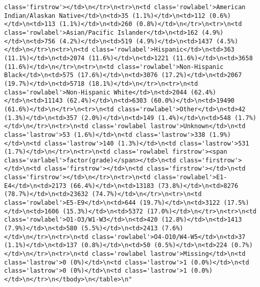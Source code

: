 \documentclass[
]{article}
\begin{document}
\begin{verbatim}
class='firstrow'></td>\n</tr>\n<tr>\n<td class='rowlabel'>American Indian/Alaskan Native</td>\n<td>35 (1.1%)</td>\n<td>112 (0.6%)</td>\n<td>113 (1.1%)</td>\n<td>260 (0.8%)</td>\n</tr>\n<tr>\n<td class='rowlabel'>Asian/Pacific Islander</td>\n<td>162 (4.9%)</td>\n<td>756 (4.2%)</td>\n<td>519 (4.9%)</td>\n<td>1437 (4.5%)</td>\n</tr>\n<tr>\n<td class='rowlabel'>Hispanic</td>\n<td>363 (11.1%)</td>\n<td>2074 (11.6%)</td>\n<td>1221 (11.6%)</td>\n<td>3658 (11.6%)</td>\n</tr>\n<tr>\n<td class='rowlabel'>Non-Hispanic Black</td>\n<td>575 (17.6%)</td>\n<td>3076 (17.2%)</td>\n<td>2067 (19.7%)</td>\n<td>5718 (18.1%)</td>\n</tr>\n<tr>\n<td class='rowlabel'>Non-Hispanic White</td>\n<td>2044 (62.4%)</td>\n<td>11143 (62.4%)</td>\n<td>6303 (60.0%)</td>\n<td>19490 (61.6%)</td>\n</tr>\n<tr>\n<td class='rowlabel'>Other</td>\n<td>42 (1.3%)</td>\n<td>357 (2.0%)</td>\n<td>149 (1.4%)</td>\n<td>548 (1.7%)</td>\n</tr>\n<tr>\n<td class='rowlabel lastrow'>Unknown</td>\n<td class='lastrow'>53 (1.6%)</td>\n<td class='lastrow'>338 (1.9%)</td>\n<td class='lastrow'>140 (1.3%)</td>\n<td class='lastrow'>531 (1.7%)</td>\n</tr>\n<tr>\n<td class='rowlabel firstrow'><span class='varlabel'>factor(grade)</span></td>\n<td class='firstrow'></td>\n<td class='firstrow'></td>\n<td class='firstrow'></td>\n<td class='firstrow'></td>\n</tr>\n<tr>\n<td class='rowlabel'>E1-E4</td>\n<td>2173 (66.4%)</td>\n<td>13183 (73.8%)</td>\n<td>8276 (78.7%)</td>\n<td>23632 (74.7%)</td>\n</tr>\n<tr>\n<td class='rowlabel'>E5-E9</td>\n<td>644 (19.7%)</td>\n<td>3122 (17.5%)</td>\n<td>1606 (15.3%)</td>\n<td>5372 (17.0%)</td>\n</tr>\n<tr>\n<td class='rowlabel'>O1-O3/W1-W3</td>\n<td>420 (12.8%)</td>\n<td>1413 (7.9%)</td>\n<td>580 (5.5%)</td>\n<td>2413 (7.6%)</td>\n</tr>\n<tr>\n<td class='rowlabel'>O4-O10/W4-W5</td>\n<td>37 (1.1%)</td>\n<td>137 (0.8%)</td>\n<td>50 (0.5%)</td>\n<td>224 (0.7%)</td>\n</tr>\n<tr>\n<td class='rowlabel lastrow'>Missing</td>\n<td class='lastrow'>0 (0%)</td>\n<td class='lastrow'>1 (0.0%)</td>\n<td class='lastrow'>0 (0%)</td>\n<td class='lastrow'>1 (0.0%)</td>\n</tr>\n</tbody>\n</table>\n"
\end{verbatim}
\end{document}
